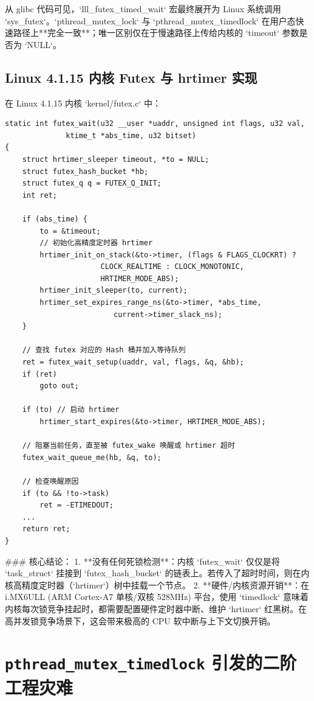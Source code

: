 \documentclass[12pt,a4paper]{article}
\begin{document}
从 glibc 代码可见，`lll_futex_timed_wait` 宏最终展开为 Linux 系统调用 `sys_futex`。`pthread_mutex_lock` 与 `pthread_mutex_timedlock` 在用户态快速路径上**完全一致**；唯一区别仅在于慢速路径上传给内核的 `timeout` 参数是否为 `NULL`。

\subsection{Linux 4.1.15 内核 Futex 与 hrtimer 实现}
在 Linux 4.1.15 内核 `kernel/futex.c` 中：

\begin{lstlisting}[caption={Linux 4.1.15 kernel/futex.c 系统调用处理}]
static int futex_wait(u32 __user *uaddr, unsigned int flags, u32 val,
		      ktime_t *abs_time, u32 bitset)
{
	struct hrtimer_sleeper timeout, *to = NULL;
	struct futex_hash_bucket *hb;
	struct futex_q q = FUTEX_Q_INIT;
	int ret;

	if (abs_time) {
		to = &timeout;
		// 初始化高精度定时器 hrtimer
		hrtimer_init_on_stack(&to->timer, (flags & FLAGS_CLOCKRT) ?
				      CLOCK_REALTIME : CLOCK_MONOTONIC,
				      HRTIMER_MODE_ABS);
		hrtimer_init_sleeper(to, current);
		hrtimer_set_expires_range_ns(&to->timer, *abs_time,
					     current->timer_slack_ns);
	}

	// 查找 futex 对应的 Hash 桶并加入等待队列
	ret = futex_wait_setup(uaddr, val, flags, &q, &hb);
	if (ret)
		goto out;

	if (to) // 启动 hrtimer
		hrtimer_start_expires(&to->timer, HRTIMER_MODE_ABS);

	// 阻塞当前任务，直至被 futex_wake 唤醒或 hrtimer 超时
	futex_wait_queue_me(hb, &q, to);

	// 检查唤醒原因
	if (to && !to->task)
		ret = -ETIMEDOUT;
    ...
    return ret;
}
\end{lstlisting}

### 核心结论：
1. **没有任何死锁检测**：内核 `futex_wait` 仅仅是将 `task_struct` 挂接到 `futex_hash_bucket` 的链表上。若传入了超时时间，则在内核高精度定时器（`hrtimer`）树中挂载一个节点。
2. **硬件/内核资源开销**：在 i.MX6ULL (ARM Cortex-A7 单核/双核 528MHz) 平台，使用 `timedlock` 意味着内核每次锁竞争挂起时，都需要配置硬件定时器中断、维护 `hrtimer` 红黑树。在高并发锁竞争场景下，这会带来极高的 CPU 软中断与上下文切换开销。

\section{\texttt{pthread\_mutex\_timedlock} 引发的二阶工程灾难}
\end{document}
